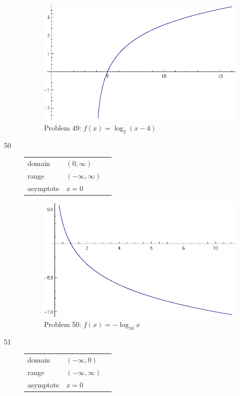 \documentclass{exam}
\begin{document}
\begin{description}
      \begin{figure}[H]
        \centering
        \includegraphics[scale = 0.9]{problem49.eps}
        \caption{Problem 49: $f(x) = \log_2(x - 4)$}
      \end{figure}

    \item[50]
      \begin{tabular}[H]{lll}
        \toprule
        domain    & $(0, \infty)$ \\
        range     & $(-\infty, \infty)$ \\
        asymptote & $x = 0$ \\
        \bottomrule
      \end{tabular}

      \begin{figure}[H]
        \centering
        \includegraphics[scale = 0.9]{problem50.eps}
        \caption{Problem 50: $f(x) = -\log_{10} x$}
      \end{figure}

    \item[51]
      \begin{tabular}[H]{lll}
        \toprule
        domain    & $(-\infty, 0)$ \\
        range     & $(-\infty, \infty)$ \\
        asymptote & $x = 0$ \\
        \bottomrule
      \end{tabular}


\end{description}
\end{document}
